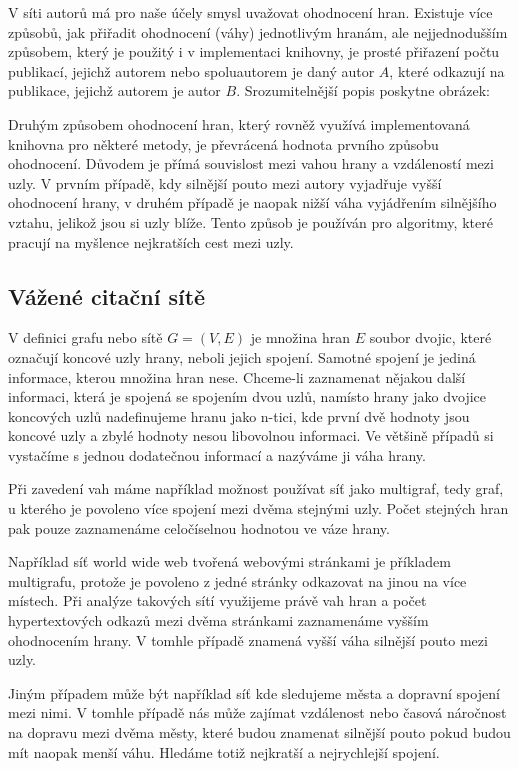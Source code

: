 \documentclass[12pt,titlepage]{report}
\begin{document}
V síti autorů má pro naše účely smysl uvažovat
ohodnocení hran. Existuje více způsobů, jak přiřadit ohodnocení (váhy)
jednotlivým hranám, ale nejjednodušším způsobem, který je použitý i v
implementaci knihovny, je prosté přiřazení počtu publikací, jejichž autorem
nebo spoluautorem je daný autor $A$, které odkazují na publikace, jejichž
autorem je autor $B$. Srozumitelnější popis poskytne obrázek:

Druhým způsobem ohodnocení hran, který rovněž využívá implementovaná knihovna
pro některé metody, je převrácená hodnota prvního způsobu ohodnocení. Důvodem
je přímá souvislost mezi vahou hrany a vzdáleností mezi uzly. V prvním případě,
kdy silnější pouto mezi autory vyjadřuje vyšší ohodnocení hrany, v druhém
případě je naopak nižší váha vyjádřením silnějšího vztahu, jelikož jsou si uzly
blíže. Tento způsob je používán pro algoritmy, které pracují na myšlence
nejkratších cest mezi uzly. 

\subsection{Vážené citační sítě}
V definici grafu nebo sítě $G = (V, E)$ je množina hran $E$ soubor dvojic,
které označují koncové uzly hrany, neboli jejich spojení. Samotné spojení je
jediná informace, kterou množina hran nese. Chceme-li zaznamenat nějakou další
informaci, která je spojená se spojením dvou uzlů, namísto hrany jako dvojice
koncových uzlů nadefinujeme hranu jako n-tici, kde první dvě hodnoty jsou
koncové uzly a zbylé hodnoty nesou libovolnou informaci. Ve většině případů si
vystačíme s jednou dodatečnou informací a nazýváme ji váha hrany.

Při zavedení vah máme například možnost používat síť jako multigraf, tedy graf,
u kterého je povoleno více spojení mezi dvěma stejnými uzly. Počet stejných
hran pak pouze zaznamenáme celočíselnou hodnotou ve váze hrany.

Například síť world wide web tvořená webovými stránkami je příkladem
multigrafu, protože je povoleno z jedné stránky odkazovat na jinou na více
místech. Při analýze takových sítí využijeme právě vah hran a počet
hypertextových odkazů mezi dvěma stránkami zaznamenáme vyšším ohodnocením
hrany. V tomhle případě znamená vyšší váha silnější pouto mezi uzly.

Jiným případem může být například síť kde sledujeme města a dopravní spojení
mezi nimi. V tomhle případě nás může zajímat vzdálenost nebo časová náročnost
na dopravu mezi dvěma městy, které budou znamenat silnější pouto pokud budou
mít naopak menší váhu. Hledáme totiž nejkratší a nejrychlejší spojení.
\end{document}
